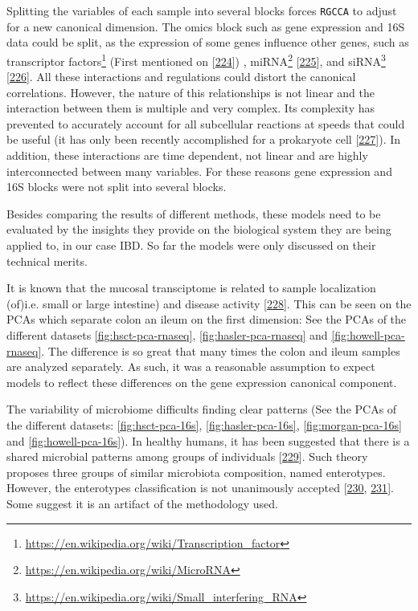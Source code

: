 \documentclass[
  12pt,
  a4paper,
  twoside,
  openright]{book}
\DeclareRobustCommand{\href}[2]{#2\footnote{\url{#1}}}
\begin{document}
Splitting the variables of each sample into several blocks forces \texttt{RGCCA} to adjust for a new canonical dimension.
The omics block such as gene expression and 16S data could be split, as the expression of some genes influence other genes, such as \href{https://en.wikipedia.org/wiki/Transcription_factor}{transcriptor factors} (First mentioned on {[}\protect\hyperlink{ref-stillman1984}{224}{]}) , \href{https://en.wikipedia.org/wiki/MicroRNA}{miRNA} {[}\protect\hyperlink{ref-lee1993}{225}{]}, and \href{https://en.wikipedia.org/wiki/Small_interfering_RNA}{siRNA} {[}\protect\hyperlink{ref-hamilton1999}{226}{]}.
All these interactions and regulations could distort the canonical correlations.
However, the nature of this relationships is not linear and the interaction between them is multiple and very complex.
Its complexity has prevented to accurately account for all subcellular reactions at speeds that could be useful (it has only been recently accomplished for a prokaryote cell {[}\protect\hyperlink{ref-thornburg2022}{227}{]}).
In addition, these interactions are time dependent, not linear and are highly interconnected between many variables.
For these reasons gene expression and 16S blocks were not split into several blocks.

Besides comparing the results of different methods, these models need to be evaluated by the insights they provide on the biological system they are being applied to, in our case IBD.
So far the models were only discussed on their technical merits.

It is known that the mucosal transciptome is related to sample localization (of)i.e.
small or large intestine) and disease activity {[}\protect\hyperlink{ref-criss2021}{228}{]}.
This can be seen on the PCAs which separate colon an ileum on the first dimension: See the PCAs of the different datasets \ref{fig:hsct-pca-rnaseq}, \ref{fig:hasler-pca-rnaseq} and \ref{fig:howell-pca-rnaseq}.
The difference is so great that many times the colon and ileum samples are analyzed separately.
As such, it was a reasonable assumption to expect models to reflect these differences on the gene expression canonical component.

The variability of microbiome difficults finding clear patterns (See the PCAs of the different datasets: \ref{fig:hsct-pca-16s}, \ref{fig:hasler-pca-16s}, \ref{fig:morgan-pca-16s} and \ref{fig:howell-pca-16s}).
In healthy humans, it has been suggested that there is a shared microbial patterns among groups of individuals {[}\protect\hyperlink{ref-arumugam2011}{229}{]}. Such theory proposes three groups of similar microbiota composition, named enterotypes. However, the enterotypes classification is not unanimously accepted {[}\protect\hyperlink{ref-koren2013}{230}, \protect\hyperlink{ref-cheng2019}{231}{]}.
Some suggest it is an artifact of the methodology used.
\end{document}
